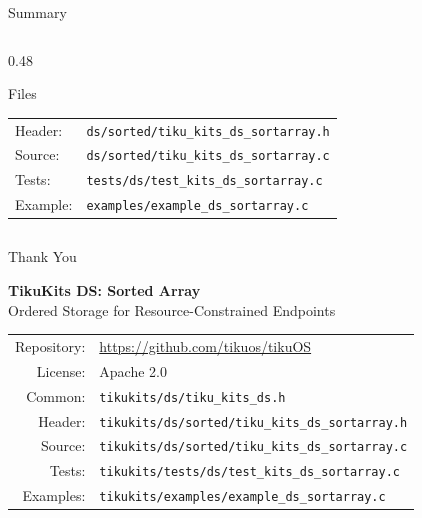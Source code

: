 \documentclass[aspectratio=169, 10pt]{beamer}
\begin{document}
\begin{frame}{Summary}
\begin{columns}[T]
\begin{column}{0.48\textwidth}
\begin{block}{Files}
\scriptsize
\begin{tabular}{@{}lp{4.5cm}@{}}
Header: & \texttt{ds/sorted/tiku\_kits\_ds\_sortarray.h} \\
Source: & \texttt{ds/sorted/tiku\_kits\_ds\_sortarray.c} \\
Tests: & \texttt{tests/ds/test\_kits\_ds\_sortarray.c} \\
Example: & \texttt{examples/example\_ds\_sortarray.c} \\
\end{tabular}
\end{block}
\end{column}
\end{columns}
\end{frame}

\begin{frame}{Thank You}
\begin{center}
\Large\textbf{TikuKits DS: Sorted Array}\\[0.5em]
\normalsize Ordered Storage for Resource-Constrained Endpoints\\[1.5em]

\begin{tabular}{rl}
  Repository: & \url{https://github.com/tikuos/tikuOS} \\
  License:    & Apache 2.0 \\
  Common:     & \texttt{tikukits/ds/tiku\_kits\_ds.h} \\
  Header:     & \texttt{tikukits/ds/sorted/tiku\_kits\_ds\_sortarray.h} \\
  Source:     & \texttt{tikukits/ds/sorted/tiku\_kits\_ds\_sortarray.c} \\
  Tests:      & \texttt{tikukits/tests/ds/test\_kits\_ds\_sortarray.c} \\
  Examples:   & \texttt{tikukits/examples/example\_ds\_sortarray.c} \\
\end{tabular}
\end{center}
\end{frame}
\end{document}
